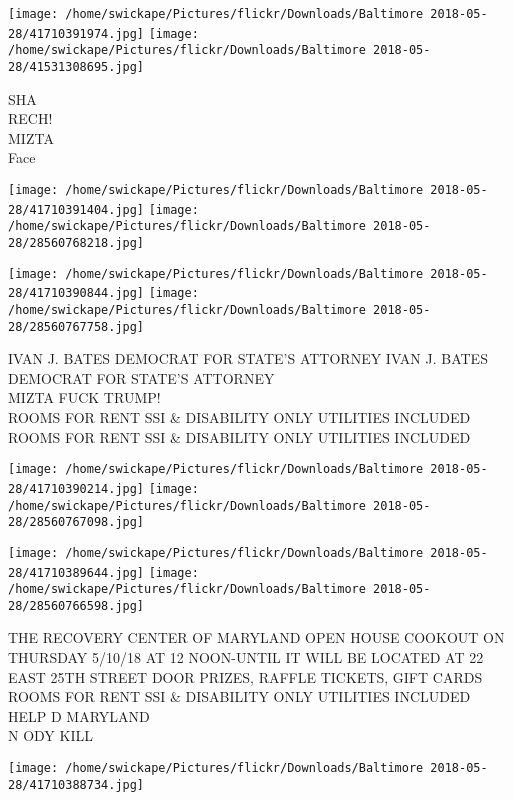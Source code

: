 \documentclass[10pt,letterpaper]{article}
\begin{document}
\texttt{[image: /home/swickape/Pictures/flickr/Downloads/Baltimore 2018-05-28/41710391974.jpg]}
\texttt{[image: /home/swickape/Pictures/flickr/Downloads/Baltimore 2018-05-28/41531308695.jpg]}

SHA\\
RECH!\\
MIZTA\\
Face\\
\pagebreak

\texttt{[image: /home/swickape/Pictures/flickr/Downloads/Baltimore 2018-05-28/41710391404.jpg]}
\texttt{[image: /home/swickape/Pictures/flickr/Downloads/Baltimore 2018-05-28/28560768218.jpg]}

\texttt{[image: /home/swickape/Pictures/flickr/Downloads/Baltimore 2018-05-28/41710390844.jpg]}
\texttt{[image: /home/swickape/Pictures/flickr/Downloads/Baltimore 2018-05-28/28560767758.jpg]}

IVAN J. BATES DEMOCRAT FOR STATE'S ATTORNEY IVAN J. BATES DEMOCRAT FOR STATE'S ATTORNEY\\
MIZTA FUCK TRUMP!\\
ROOMS FOR RENT SSI \& DISABILITY ONLY UTILITIES INCLUDED\\
ROOMS FOR RENT SSI \& DISABILITY ONLY UTILITIES INCLUDED\\
\pagebreak

\texttt{[image: /home/swickape/Pictures/flickr/Downloads/Baltimore 2018-05-28/41710390214.jpg]}
\texttt{[image: /home/swickape/Pictures/flickr/Downloads/Baltimore 2018-05-28/28560767098.jpg]}

\texttt{[image: /home/swickape/Pictures/flickr/Downloads/Baltimore 2018-05-28/41710389644.jpg]}
\texttt{[image: /home/swickape/Pictures/flickr/Downloads/Baltimore 2018-05-28/28560766598.jpg]}

THE RECOVERY CENTER OF MARYLAND OPEN HOUSE COOKOUT ON THURSDAY 5/10/18 AT 12 NOON{-}UNTIL IT WILL BE LOCATED AT 22 EAST 25TH STREET DOOR PRIZES, RAFFLE TICKETS, GIFT CARDS\\
ROOMS FOR RENT SSI \& DISABILITY ONLY UTILITIES INCLUDED\\
HELP D MARYLAND\\
N ODY KILL\\
\pagebreak

\texttt{[image: /home/swickape/Pictures/flickr/Downloads/Baltimore 2018-05-28/41710388734.jpg]}
\end{document}
